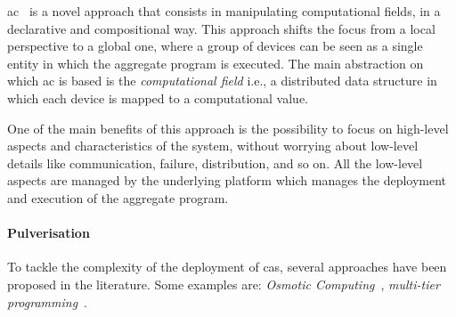 \documentclass[12pt]{article}
\begin{document}
\ac{ac}~\cite{DBLP:journals/computer/BealPV15} is a novel approach that consists in manipulating computational fields,
in a declarative and compositional way.
%
This approach shifts the focus from a local perspective to a global one,
where a group of devices can be seen as a single entity in which the aggregate program is executed.
%
The main abstraction on which \ac{ac} is based is the \emph{computational field} i.e.,
a distributed data structure in which each device is mapped to a computational value.

One of the main benefits of this approach is the possibility to focus on high-level aspects and characteristics of the system,
without worrying about low-level details like communication, failure, distribution, and so on.
%
All the low-level aspects are managed by the underlying platform which manages the deployment and execution of the aggregate program.



\paragraph{Pulverisation}
To tackle the complexity of the deployment of \ac{cas},
several approaches have been proposed in the literature.
%
Some examples are: \emph{Osmotic Computing}~\cite{DBLP:journals/tiot/NehaPSSG22}, \emph{multi-tier programming}~\cite{DBLP:journals/csur/WeisenburgerWS20}.
\end{document}
